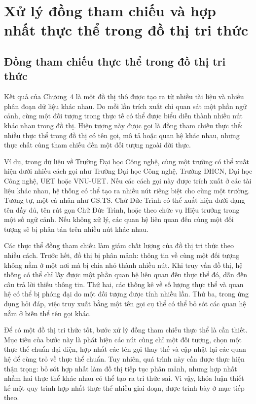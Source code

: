 \chapter{Xử lý đồng tham chiếu và hợp nhất thực thể trong đồ thị tri thức}

\section{Đồng tham chiếu thực thể trong đồ thị tri thức}

Kết quả của Chương~4 là một đồ thị thô được tạo ra từ nhiều tài liệu và nhiều phân đoạn dữ liệu khác nhau. Do mỗi lần trích xuất chỉ quan sát một phần ngữ cảnh, cùng một đối tượng trong thực tế có thể được biểu diễn thành nhiều nút khác nhau trong đồ thị. Hiện tượng này được gọi là đồng tham chiếu thực thể: nhiều thực thể trong đồ thị có tên gọi, mô tả hoặc quan hệ khác nhau, nhưng thực chất cùng tham chiếu đến một đối tượng ngoài đời thực.

Ví dụ, trong dữ liệu về Trường Đại học Công nghệ, cùng một trường có thể xuất hiện dưới nhiều cách gọi như Trường Đại học Công nghệ, Trường ĐHCN, Đại học Công nghệ, UET hoặc VNU-UET. Nếu các cách gọi này được trích xuất ở các tài liệu khác nhau, hệ thống có thể tạo ra nhiều nút riêng biệt cho cùng một trường. Tương tự, một cá nhân như GS.TS. Chử Đức Trình có thể xuất hiện dưới dạng tên đầy đủ, tên rút gọn Chử Đức Trình, hoặc theo chức vụ Hiệu trưởng trong một số ngữ cảnh. Nếu không xử lý, các quan hệ liên quan đến cùng một đối tượng sẽ bị phân tán trên nhiều nút khác nhau.

Các thực thể đồng tham chiếu làm giảm chất lượng của đồ thị tri thức theo nhiều cách. Trước hết, đồ thị bị phân mảnh: thông tin về cùng một đối tượng không nằm ở một nơi mà bị chia nhỏ thành nhiều nút. Khi truy vấn đồ thị, hệ thống có thể chỉ lấy được một phần quan hệ liên quan đến thực thể đó, dẫn đến câu trả lời thiếu thông tin. Thứ hai, các thống kê về số lượng thực thể và quan hệ có thể bị phóng đại do một đối tượng được tính nhiều lần. Thứ ba, trong ứng dụng hỏi đáp, việc truy xuất bằng một tên gọi cụ thể có thể bỏ sót các quan hệ nằm ở biến thể tên gọi khác.

Để có một đồ thị tri thức tốt, bước xử lý đồng tham chiếu thực thể là cần thiết. Mục tiêu của bước này là phát hiện các nút cùng chỉ một đối tượng, chọn một thực thể chuẩn đại diện, hợp nhất các tên gọi thay thế và cập nhật lại các quan hệ để cùng trỏ về thực thể chuẩn. Tuy nhiên, quá trình này cần được thực hiện thận trọng: bỏ sót hợp nhất làm đồ thị tiếp tục phân mảnh, nhưng hợp nhất nhầm hai thực thể khác nhau có thể tạo ra tri thức sai. Vì vậy, khóa luận thiết kế một quy trình hợp nhất thực thể nhiều giai đoạn, được trình bày ở mục tiếp theo.

